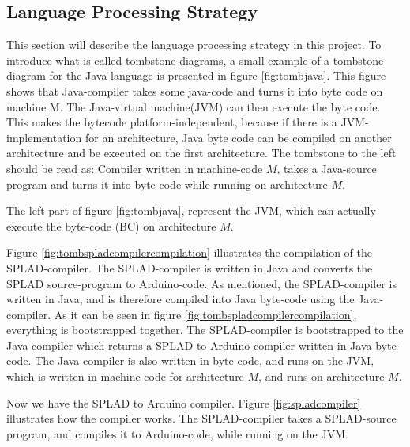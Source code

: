 \subsection{Language Processing Strategy}
\label{sec:LanguageProcessingStrategy}
This section will describe the language processing strategy in this project. To introduce what is called tombstone diagrams, a small example of a tombstone diagram for the Java-language is presented in figure \ref{fig:tombjava}. This figure shows that Java-compiler takes some java-code and turns it into byte code on machine M. The Java-virtual machine(JVM) can then execute the byte code. This makes the bytecode platform-independent, because if there is a JVM-implementation for an architecture, Java byte code can be compiled on another architecture and be executed on the first architecture. The tombstone to the left should be read as: Compiler written in machine-code $M$, takes a Java-source program and turns it into byte-code while running on architecture $M$.


The left part of figure \ref{fig:tombjava}, represent the JVM, which can actually execute the byte-code (BC) on architecture $M$.

Figure \ref{fig:tombspladcompilercompilation} illustrates the compilation of the SPLAD-compiler. The SPLAD-compiler is written in Java and converts the SPLAD source-program to Arduino-code. As mentioned, the SPLAD-compiler is written in Java, and is therefore compiled into Java byte-code using the Java-compiler. As it can be seen in figure \ref{fig:tombspladcompilercompilation}, everything is bootstrapped together. The SPLAD-compiler is bootstrapped to the Java-compiler which returns a SPLAD to Arduino compiler written in Java byte-code. The Java-compiler is also written in byte-code, and runs on the JVM, which is written in machine code for architecture $M$, and runs on architecture $M$.

Now we have the SPLAD to Arduino compiler. Figure \ref{fig:spladcompiler} illustrates how the compiler works. The SPLAD-compiler takes a SPLAD-source program, and compiles it to Arduino-code, while running on the JVM.
